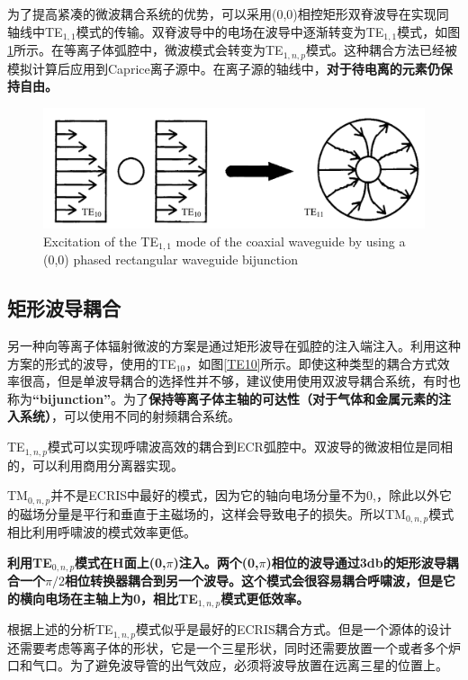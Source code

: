 \documentclass[fontset=windows]{article}
\begin{document}
为了提高紧凑的微波耦合系统的优势，可以采用(0,0)相控矩形双脊波导在实现同轴线中TE$_{1,1}$模式的传输。双脊波导中的电场在波导中逐渐转变为TE$_{1,1}$模式，如图\ref{Excitation-1}所示。在等离子体弧腔中，微波模式会转变为TE$_{1,n,p}$模式。这种耦合方法已经被模拟计算后应用到Caprice离子源中。在离子源的轴线中，\textbf{对于待电离的元素仍保持自由。}

\begin{figure}
    \centering
    \includegraphics{Excitation of.png}
    \caption{Excitation of the TE$_{1,1}$ mode of the coaxial waveguide by using a (0,0) phased
    rectangular waveguide bijunction}
    \label{Excitation-1}
\end{figure}

\subsection{矩形波导耦合}
另一种向等离子体辐射微波的方案是通过矩形波导在弧腔的注入端注入。利用这种方案的形式的波导，使用的TE$_{10}$，如图\ref{TE10}所示。即使这种类型的耦合方式效率很高，但是单波导耦合的选择性并不够，建议使用使用双波导耦合系统，有时也称为\textbf{“bijunction”}。为了\textbf{保持等离子体主轴的可达性（对于气体和金属元素的注入系统）}，可以使用不同的射频耦合系统。

TE$_{1,n,p}$模式可以实现呼啸波高效的耦合到ECR弧腔中。双波导的微波相位是同相的，可以利用商用分离器实现。

TM$_{0,n,p}$并不是ECRIS中最好的模式，因为它的轴向电场分量不为0,，除此以外它的磁场分量是平行和垂直于主磁场的，这样会导致电子的损失。所以TM$_{0,n,p}$模式相比利用呼啸波的模式效率更低。

\textbf{利用TE$_{0,n,p}$模式在H面上(0,$\pi$)注入。两个(0,$\pi$)相位的波导通过3db的矩形波导耦合一个$\pi /2$相位转换器耦合到另一个波导。这个模式会很容易耦合呼啸波，但是它的横向电场在主轴上为0，相比TE$_{1,n,p}$模式更低效率。}

根据上述的分析TE$_{1,n,p}$模式似乎是最好的ECRIS耦合方式。但是一个源体的设计还需要考虑等离子体的形状，它是一个三星形状，同时还需要放置一个或者多个炉口和气口。为了避免波导管的出气效应，必须将波导放置在远离三星的位置上。
\end{document}
